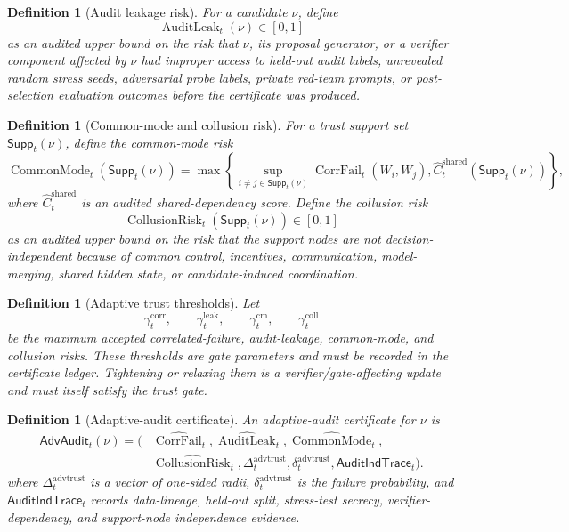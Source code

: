 \documentclass[11pt,a4paper]{article}
\newtheorem{definition}[theorem]{Definition}
\newcommand{\advtrust}{\mathrm{advtrust}}
\newcommand{\CorrFail}{\operatorname{CorrFail}}
\newcommand{\AuditLeak}{\operatorname{AuditLeak}}
\newcommand{\CommonMode}{\operatorname{CommonMode}}
\newcommand{\CollusionRisk}{\operatorname{CollusionRisk}}
\begin{document}
\begin{definition}[Audit leakage risk]
\label{def:audit-leak-rclm}
For a candidate \(\nu\), define
\[
\AuditLeak_t(\nu)\in[0,1]
\]
as an audited upper bound on the risk that \(\nu\), its proposal generator, or a verifier component affected by \(\nu\) had improper access to held-out audit labels, unrevealed random stress seeds, adversarial probe labels, private red-team prompts, or post-selection evaluation outcomes before the certificate was produced.
\end{definition}

\begin{definition}[Common-mode and collusion risk]
\label{def:common-mode-collusion-rclm}
For a trust support set \(\mathsf{Supp}_t(\nu)\), define the common-mode risk
\[
\CommonMode_t(\mathsf{Supp}_t(\nu))
=
\max\left\{
\sup_{i\ne j\in\mathsf{Supp}_t(\nu)}\CorrFail_t(W_i,W_j),
\widehat C_t^{\mathrm{shared}}(\mathsf{Supp}_t(\nu))
\right\},
\]
where \(\widehat C_t^{\mathrm{shared}}\) is an audited shared-dependency score.  Define the collusion risk
\[
\CollusionRisk_t(\mathsf{Supp}_t(\nu))\in[0,1]
\]
as an audited upper bound on the risk that the support nodes are not decision-independent because of common control, incentives, communication, model-merging, shared hidden state, or candidate-induced coordination.
\end{definition}

\begin{definition}[Adaptive trust thresholds]
\label{def:adaptive-trust-thresholds}
Let
\[
\gamma_t^{\mathrm{corr}},\qquad
\gamma_t^{\mathrm{leak}},\qquad
\gamma_t^{\mathrm{cm}},\qquad
\gamma_t^{\mathrm{coll}}
\]
be the maximum accepted correlated-failure, audit-leakage, common-mode, and collusion risks.  These thresholds are gate parameters and must be recorded in the certificate ledger.  Tightening or relaxing them is a verifier/gate-affecting update and must itself satisfy the trust gate.
\end{definition}

\begin{definition}[Adaptive-audit certificate]
\label{def:adaptive-audit-certificate}
An adaptive-audit certificate for \(\nu\) is
\[
\begin{aligned}
\mathsf{AdvAudit}_t(\nu)=(&\widehat{\CorrFail}_t,\widehat{\AuditLeak}_t,
\widehat{\CommonMode}_t,\\
&\widehat{\CollusionRisk}_t,
\Delta_t^{\advtrust},\delta_t^{\advtrust},
\mathsf{AuditIndTrace}_t).
\end{aligned}
\]
where \(\Delta_t^{\advtrust}\) is a vector of one-sided radii, \(\delta_t^{\advtrust}\) is the failure probability, and \(\mathsf{AuditIndTrace}_t\) records data-lineage, held-out split, stress-test secrecy, verifier-dependency, and support-node independence evidence.
\end{definition}
\end{document}
